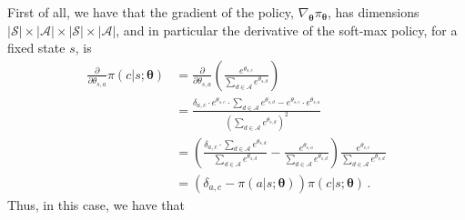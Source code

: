 First of all, we have that the gradient of the policy, $\nabla_{\boldsymbol \theta} \pi_{\boldsymbol \theta}$, has dimensions $|\mathcal S| \times |\mathcal A| \times |\mathcal S| \times |\mathcal A|$, and in particular the derivative of the soft-max policy, for a fixed state $s$, is
\begin{equation*}
    \begin{aligned}
        \frac{\partial}{\partial \theta_{s, a}} \pi(c | s; \boldsymbol \theta)
        &= \frac{\partial}{\partial \theta_{s, a}} \left(\frac{e^{\theta_{s,c} }}{\sum_{d \in \mathcal A} e^{\theta_{s,d} }} \right) \\
        &= \frac{\delta_{a,c} \cdot e^{\theta_{s,c}} \cdot \sum_{d \in \mathcal A} e^{\theta_{s,d} } -  e^{\theta_{s,c} } \cdot e^{\theta_{s, a} }}{(\sum_{d \in \mathcal A} e^{\theta_{s,d}})^2} \\
        &= \left(\frac{\delta_{a,c} \cdot \sum_{d \in \mathcal A} e^{\theta_{s,d} }}{\sum_{d \in \mathcal A} e^{\theta_{s,d} }} - \frac{e^{\theta_{s,a} }}{\sum_{d \in \mathcal A} e^{\theta_{s,d} }} \right) \frac{e^{\theta_{s,c}}}{\sum_{d \in \mathcal A} e^{\theta_{s,d} }} \\
        &= \left(\delta_{a,c} - \pi(a | s; \boldsymbol \theta) \right) \pi(c|s; \boldsymbol \theta)  \, .
    \end{aligned}
\end{equation*}
Thus, in this case, we have that
